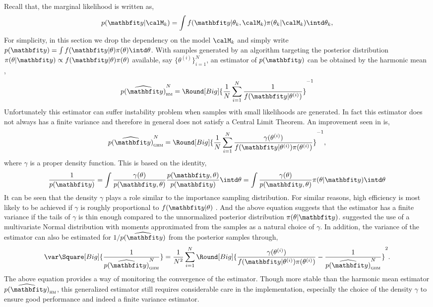 Recall that, the marginal likelihood is written as,
\begin{equation*}
  p(\data|\calM_k) = \int
  f(\data|\theta_k,\calM_k)\pi(\theta_k|\calM_k)\intd\theta_k,
\end{equation*}
For simplicity, in this section we drop the dependency on the model $\calM_k$
and simply write $p(\data) = \int f(\data|\theta)\pi(\theta)\intd\theta$.
With samples generated by an \mcmc algorithm targeting the posterior
distribution $\pi(\theta|\data) \propto f(\data|\theta) \pi(\theta)$
available, say $\{\theta^{(i)}\}_{i=1}^N$, an estimator of $p(\data)$ can be
obtained by the harmonic mean \cite{Newton:1994wm},
\begin{equation}
  \widehat{p(\data)}_{\text{\textsc{hm}}}^N =
  \Round[Big]{\frac{1}{N}\sum_{i=1}^N\frac{1}{f(\data|\theta^{(i)})}}^{-1}
\end{equation}
Unfortunately this estimator can suffer instability problem when samples with
small likelihoods are generated. In fact this estimator does not always has a
finite variance and therefore in general does not satisfy a Central Limit
Theorem. An improvement seen in \cite{Kass:1995vb} is,
\begin{equation}
  \widehat{p(\data)}_{\text{\textsc{ghm}}}^N = \Round[Big]{
    \frac{1}{N}\sum_{i=1}^N
    \frac{\gamma(\theta^{(i)})}{f(\data|\theta^{(i)})\pi(\theta^{(i)})}}^{-1},
\end{equation}
where $\gamma$ is a proper density function. This is based on the identity,
\begin{equation}
  \frac{1}{p(\data)}
  = \int \frac{\gamma(\theta)}{p(\data,\theta)}
  \frac{p(\data,\theta)}{p(\data)} \intd \theta
  = \int \frac{\gamma(\theta)}{p(\data,\theta)} \pi(\theta|\data) \intd \theta
\end{equation}
It can be seen that the density $\gamma$ plays a role similar to the
importance sampling distribution. For similar reasons, high efficiency is most
likely to be achieved if $\gamma$ is roughly proportional to $f(\data|\theta)$
\cite{Kass:1995vb}. And the above equation suggests that the estimator has a
finite variance if the tails of $\gamma$ is thin enough compared to the
unnormalized posterior distribution $\pi(\theta|\data)$.
\cite{Gelfand:1994ux} suggested the use of a multivariate Normal distribution
with moments approximated from the samples as a natural choice of $\gamma$. In
addition, the variance of the estimator can also be estimated for
$1/\widehat{p(\data)}$ from the posterior samples through,
\begin{equation}
  \var\Square[Big]{\frac{1}{\widehat{p(\data)}_{\text{\textsc{ghm}}}^N}} =
  \frac{1}{N^2}\sum_{i=1}^N \Round[Big]{
    \frac{\gamma(\theta^{(i)})}{f(\data|\theta^{(i)})\pi(\theta^{(i)})}
    - \frac{1}{\widehat{p(\data)}_{\text{\textsc{ghm}}}^N}}^2.
\end{equation}
The above equation provides a way of monitoring the convergence of the
estimator. Though more stable than the harmonic mean estimator
$\widehat{p(\data)}_{\text{\textsc{hm}}}$, this generalized estimator still
requires considerable care in the implementation, especially the choice of the
density $\gamma$ to ensure good performance and indeed a finite variance
estimator.

